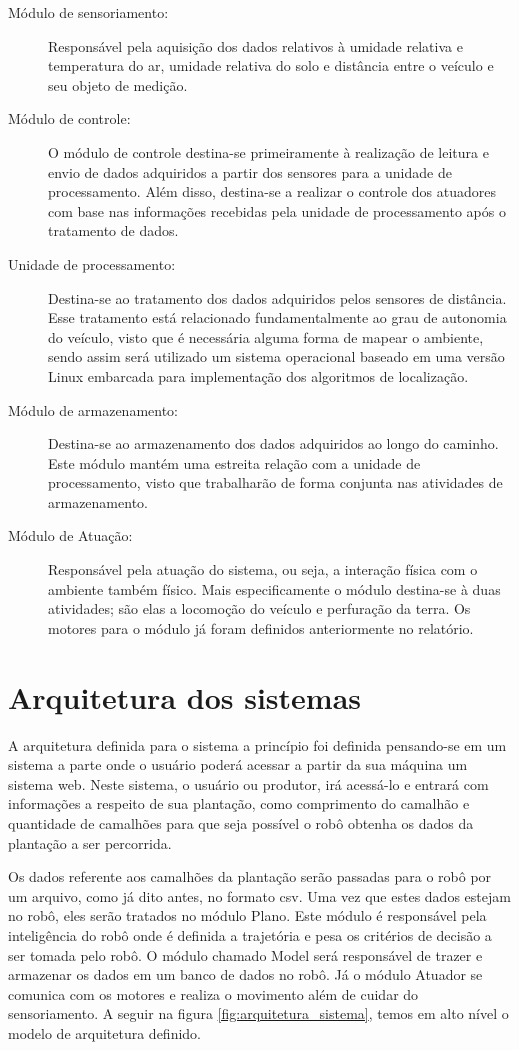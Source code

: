 \begin{description}
\item[Módulo de sensoriamento:] Responsável pela aquisição dos dados relativos à
umidade relativa e temperatura do ar, umidade relativa do solo e distância
entre o veículo e seu objeto de medição.
\item[Módulo de controle:] O módulo de controle destina-se primeiramente à
realização de leitura e envio de dados adquiridos a partir dos sensores
para a unidade de processamento. Além disso, destina-se a realizar o
controle dos atuadores com base nas informações recebidas pela unidade de processamento após o tratamento de dados.
\item[Unidade de processamento:] Destina-se ao tratamento dos dados
adquiridos pelos sensores de distância. Esse tratamento está relacionado
fundamentalmente ao grau de autonomia do veículo, visto que é necessária
alguma forma de mapear o ambiente, sendo assim será utilizado um sistema
operacional baseado em uma versão Linux embarcada para implementação
dos algoritmos de localização.
\item[Módulo de armazenamento:] Destina-se ao armazenamento dos dados
adquiridos ao longo do caminho. Este módulo mantém uma estreita relação
com a unidade de processamento, visto que trabalharão de forma conjunta
nas atividades de armazenamento.
\item[Módulo de Atuação:] Responsável pela atuação do sistema, ou seja,
a interação física com o ambiente também físico. Mais especificamente
o módulo destina-se à duas atividades; são elas a locomoção do veículo
e perfuração da terra. Os motores para o módulo já foram definidos
anteriormente no relatório.
\end{description}

\section{Arquitetura dos sistemas}
A arquitetura definida para o sistema a princípio foi definida pensando-se em um sistema a parte onde o usuário poderá acessar a partir da sua máquina um sistema web. Neste sistema, o usuário ou produtor, irá acessá-lo e entrará com informações a respeito de sua plantação, como comprimento do camalhão e quantidade de camalhões para que seja possível o robô obtenha os dados da plantação a ser percorrida.

Os dados referente aos camalhões da plantação serão passadas para o robô por um arquivo, como já dito antes, no formato csv. Uma vez que estes dados estejam no robô, eles serão tratados no módulo Plano. Este módulo é responsável pela inteligência do robô onde é definida a trajetória e pesa os critérios de decisão a ser tomada pelo robô. O módulo chamado Model será responsável de trazer e armazenar os dados em um banco de dados no robô. Já o módulo Atuador se comunica com os motores e realiza o movimento além de cuidar do sensoriamento. A seguir na figura \ref{fig:arquitetura_sistema}, temos em alto nível o modelo de arquitetura definido.

